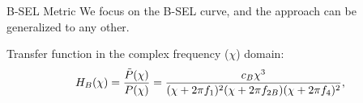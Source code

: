 \documentclass{beamer}
\newcounter{sectionframecount}
\begin{document}
\begin{frame}[t]{B-SEL Metric}
\vspace{-10pt}
We focus on the B-SEL curve, and the approach can be generalized to any other.

{
\vspace{4pt}
Transfer function in the complex frequency ($\chi$) domain:
\vspace{-5pt}
\begin{equation}
  \small
  H_B(\chi) =\dfrac{\tilde{P}(\chi)}{P(\chi)} = \dfrac{c_B \chi^3}{(\chi+2\pi f_1)^2(\chi+2\pi f_{2B})(\chi+2\pi f_4)^2},
  \label{e:continuous_transfer}
\end{equation}
}

{
}
\end{frame}

\end{document}
